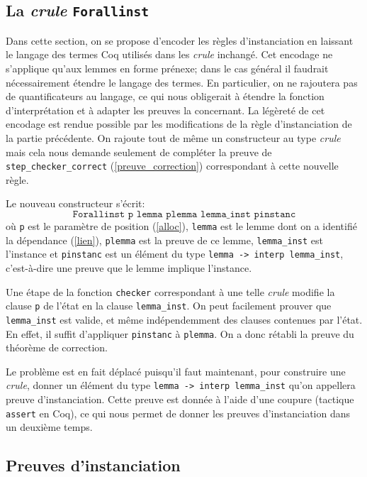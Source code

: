 \documentclass[11pt]{article}
\begin{document}
\subsection{La \textit{crule} \texttt{Forallinst}}

Dans cette section, on se propose d'encoder les règles d'instanciation en laissant le langage des termes Coq utilisés dans les \textit{crule} inchangé. Cet encodage ne s'applique qu'aux lemmes en forme prénexe; dans le cas général il faudrait nécessairement étendre le langage des termes. En particulier, on ne rajoutera pas de quantificateurs au langage, ce qui nous obligerait à étendre la fonction d'interprétation et à adapter les preuves la concernant. La légèreté de cet encodage est rendue possible par les modifications de la règle d'instanciation de la partie précédente. On rajoute tout de même un constructeur au type \textit{crule} mais cela nous demande seulement de compléter la preuve de  \texttt{step\_checker\_correct} (\ref{preuve_correction}) correspondant à cette nouvelle règle.   \medbreak

Le nouveau constructeur s'écrit:
\[\texttt{Forallinst p lemma plemma lemma\_inst pinstanc}\]
où \texttt{p} est le para\-mètre de position (\ref{alloc}), \texttt{lemma} est le lemme dont on a identifié la dépendance (\ref{lien}), \texttt{plemma} est la preuve de ce lemme, \texttt{lemma\_inst} est l'instance et \texttt{pinstanc} est un élément du type \texttt{lemma -> interp lemma\_inst}, c'est-à-dire une preuve que le lemme implique l'instance. \medbreak

Une étape de la fonction \texttt{checker} correspondant à une telle \textit{crule} modifie la clause \texttt{p} de l'état en la clause \texttt{lemma\_inst}. On peut facilement prouver que \texttt{lemma\_inst} est valide, et même indépendemment des clauses contenues par l'état. En effet, il suffit d'appliquer \texttt{pinstanc} à \texttt{plemma}. On a donc rétabli la preuve du théorème de correction.\medbreak

Le problème est en fait déplacé puisqu'il faut maintenant, pour construire une \textit{crule}, donner un élément du type \texttt{lemma -> interp lemma\_inst} qu'on appellera preuve d'instanciation. Cette preuve est donnée à l'aide d'une coupure (tactique \texttt{assert} en Coq), ce qui nous permet de donner les preuves d'instanciation dans un deuxième temps.

\subsection{Preuves d'instanciation} \label{preuve_instanciation}
\end{document}
